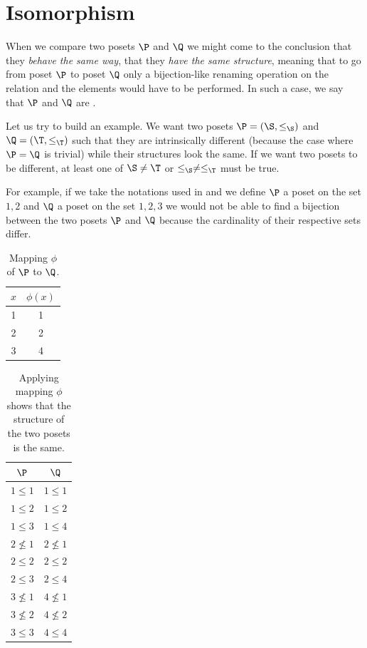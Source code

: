 \section{Isomorphism}

When we compare two posets $\P$ and $\Q$ we might come to the conclusion that
they \emph{behave the same way}, that they \emph{have the same structure},
meaning that to go from poset $\P$ to poset $\Q$ only a bijection-like renaming
operation on the relation and the elements would have to be performed. In such
a case, we say that $\P$ and $\Q$ are .

Let us try to build an example. We want two posets $\P = (\S, \le_{\S})$ and $\Q =
(\T, \le_{\T})$ such that they are intrinsically different (because the case where
$\P = \Q$ is trivial) while their structures look the same. If we want two posets
to be different, at least one of $\S \neq \T$ or $\le_{\S} \neq \le_{\T}$ must be true.

For example, if we take the notations used in  and we
define $\P$ a poset on the set ${1, 2}$ and $\Q$ a poset on the set ${1, 2, 3}$
we would not be able to find a bijection between the two posets $\P$ and $\Q$
because the cardinality of their respective sets differ.

\begin{table}
\centering
\caption{Mapping $\phi$ of $\P$ to $\Q$.}
\label{table:poset:iso:a}
\begin{tabular}{c|c}
	$x$ & $\phi(x)$ \\
	\hline
	1 & 1 \\
	2 & 2 \\
	3 & 4 \\
\end{tabular}
\end{table}

\begin{table}
\centering
\caption{Applying mapping $\phi$ shows that the structure of the two posets is
the same.}
\label{table:poset:iso:b}
\begin{tabular}{c|c}
	$\P$ & $\Q$\\
	\hline
	$1 \le 1$   & $1 \le 1$\\
	$1 \le 2$   & $1 \le 2$\\
	$1 \le 3$   & $1 \le 4$\\
	$2 \nleq 1$ & $2 \nleq 1$\\
	$2 \le 2$   & $2 \le 2$\\
	$2 \le 3$   & $2 \le 4$\\
	$3 \nleq 1$ & $4 \nleq 1$\\
	$3 \nleq 2$ & $4 \nleq 2$\\
	$3 \le 3$   & $4 \le 4$\\
\end{tabular}
\end{table}

